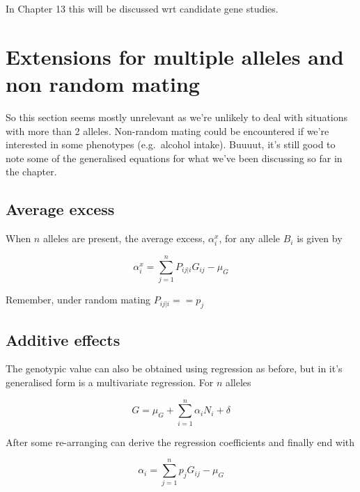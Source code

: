 \documentclass[
]{book}
\begin{document}
In Chapter 13 this will be discussed wrt candidate gene studies.

\hypertarget{extensions-for-multiple-alleles-and-non-random-mating}{%
\section{Extensions for multiple alleles and non random mating}\label{extensions-for-multiple-alleles-and-non-random-mating}}

So this section seems mostly unrelevant as we're unlikely to deal with situations with more than 2 alleles. Non-random mating could be encountered if we're interested in some phenotypes (e.g.~alcohol intake). Buuuut, it's still good to note some of the generalised equations for what we've been discussing so far in the chapter.

\hypertarget{average-excess}{%
\subsection{Average excess}\label{average-excess}}

When \(n\) alleles are present, the average excess, \(\alpha^x_i\), for any allele \(B_i\) is given by

\begin{equation}
  \alpha^x_i = \sum_{j=1}^{n} P_{ij|i}G_{ij} - \mu_G
  \label{eq:average-excess-effect3}
\end{equation}

Remember, under random mating \(P_{ij|i} == p_j\)

\hypertarget{additive-effects}{%
\subsection{Additive effects}\label{additive-effects}}

The genotypic value can also be obtained using regression as before, but in it's generalised form is a multivariate regression. For \(n\) alleles

\begin{equation}
  G = \mu_G + \sum_{i=1}^{n} \alpha_{i}N_{i} + \delta
  \label{eq:generalised-genotypic-value-regression}
\end{equation}

After some re-arranging can derive the regression coefficients and finally end with

\begin{equation}
  \alpha_i = \sum_{j=1}^{n} p_jG_{ij} - \mu_G
  \label{eq:all-average-effects}
\end{equation}
\end{document}
